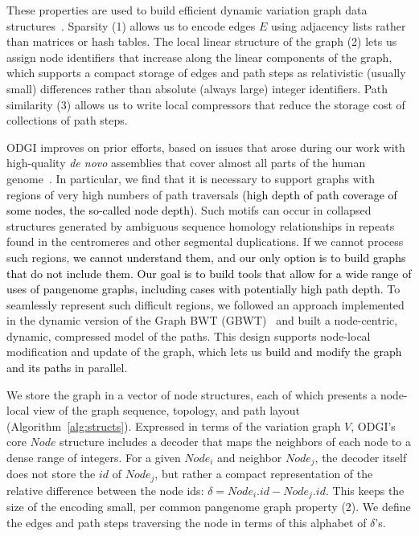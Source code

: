 \documentclass{bioinfo}
\newcommand{\red}[1]{{\textcolor{Red}{#1}}}
\newcommand{\FIXME}[1]{\red{[FIXME: #1]}}
\newcommand{\REVIEWED}[1]{{\textcolor{Black}{#1}}}
\begin{document}
These properties are used to build efficient dynamic variation graph data structures~\citep{Siren:2020,Eizenga_2020_BX}.
Sparsity (1) allows us to encode edges $E$ using adjacency lists rather than matrices or hash tables.
The local linear structure of the graph (2) lets us assign node identifiers that increase along the linear components of the graph, which supports a compact storage of edges and path steps as relativistic (usually small) differences rather than absolute (always large) integer identifiers.
Path similarity (3) allows us to write local compressors that reduce the storage cost of collections of path steps.

ODGI improves on prior efforts, based on issues that arose during our work with high-quality \textit{de novo} assemblies that cover almost all parts of the human genome~\citep{Logsdon_2021,Nurk_2021}.
In particular, we find that it is necessary to support graphs with regions of very high numbers of path traversals \REVIEWED{(high depth of path coverage of some nodes, the so-called node depth)}.
Such motifs can occur in collapsed structures generated by ambiguous sequence homology relationships in repeats found in the centromeres and other segmental duplications.
If we cannot process such regions, \REVIEWED{we cannot understand them}, and \REVIEWED{our only option is to build graphs that do not include them.}
\REVIEWED{Our goal is to build tools that allow for a wide range of uses of pangenome graphs, including cases with potentially high path depth.}
To seamlessly represent such difficult regions, we followed an approach implemented in the dynamic version of the Graph BWT (GBWT)~\citep{Siren:2020} and built a node-centric, dynamic, compressed model of the paths.
This design supports node-local modification and update of the graph, which lets us \REVIEWED{build and modify the graph and its paths} in parallel.

We store the graph in a vector of node structures, each of which presents a node-local view of the graph sequence, topology, and path layout (Algorithm~\ref{alg:structs}).
Expressed in terms of the variation graph $V$, ODGI's core $Node$ structure includes a decoder that maps the neighbors of each node to a dense range of integers.
For a given $Node_i$ and neighbor $Node_j$, the decoder itself does not store the $id$ of $Node_j$, but rather a compact representation of the relative difference between the node ids: $\delta = Node_i.id - Node_j.id$.
This keeps the size of the encoding small, per common pangenome graph property (2).
We define the edges and path steps traversing the node in terms of this alphabet of $\delta$'s.
\end{document}

